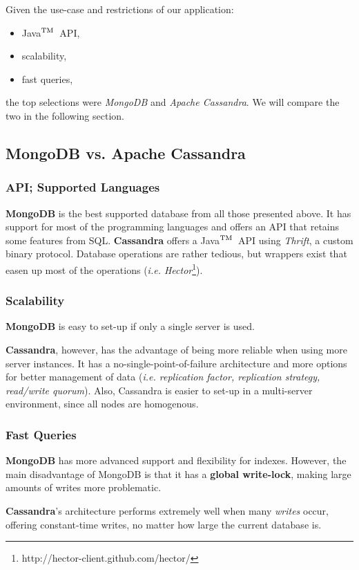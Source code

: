 \documentclass[a4paper,onecolumn,oneside,titlepage,11pt]{report}
\def\tm{\leavevmode\hbox{$\rm {}^{TM}$}}
\begin{document}
	Given the use-case and restrictions of our application:
	\begin{itemize}
		\item Java\tm\ API,
		\item scalability,
		\item fast queries,
	\end{itemize}
	the top selections were \emph{MongoDB} and \emph{Apache Cassandra}. We will compare the two in the following section.
	\subsection{MongoDB vs. Apache Cassandra}
	\subsubsection*{API; Supported Languages}
	\textbf{MongoDB} is the best supported database from all those presented above. It has support for most of the programming languages and offers an API that retains some features from SQL.
	\noindent\textbf{Cassandra} offers a Java\tm\ API using \emph{Thrift}, a custom binary protocol. Database operations are rather tedious, but wrappers exist that easen up most of the operations (\emph{i.e. Hector}\footnote{http://hector-client.github.com/hector/}).
	\subsubsection*{Scalability}
	\textbf{MongoDB} is easy to set-up if only a single server is used.
	
	\noindent\textbf{Cassandra}, however, has the advantage of being more reliable when using more server instances. It has a no-single-point-of-failure architecture and more options for better management of data (\emph{i.e. replication factor, replication strategy, read/write quorum}). Also, Cassandra is easier to set-up in a multi-server environment, since all nodes are homogenous.
	\subsubsection*{Fast Queries}
	
	\indent\textbf{MongoDB} has more advanced support and flexibility for indexes. However, the main disadvantage of MongoDB is that it has a \textbf{global write-lock}, making large amounts of writes more problematic.
	
	\noindent\textbf{Cassandra}'s architecture performs extremely well when many \emph{writes} occur, offering constant-time writes, no matter how large the current database is.
	
\end{document}
